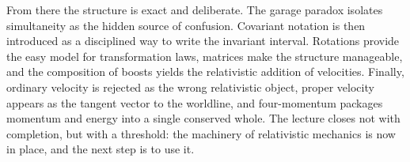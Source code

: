 From there the structure is exact and deliberate. The garage paradox isolates simultaneity as the hidden source of confusion. Covariant notation is then introduced as a disciplined way to write the invariant interval. Rotations provide the easy model for transformation laws, matrices make the structure manageable, and the composition of boosts yields the relativistic addition of velocities. Finally, ordinary velocity is rejected as the wrong relativistic object, proper velocity appears as the tangent vector to the worldline, and four-momentum packages momentum and energy into a single conserved whole. The lecture closes not with completion, but with a threshold: the machinery of relativistic mechanics is now in place, and the next step is to use it.